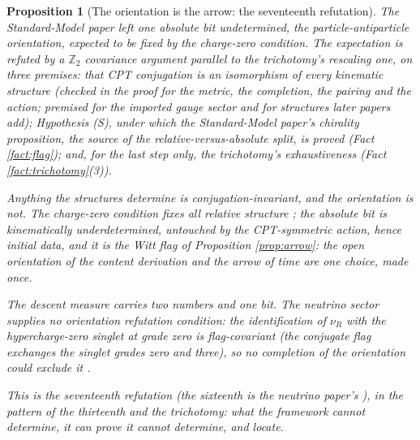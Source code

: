\documentclass[11pt]{article}
\newtheorem{proposition}[theorem]{Proposition}
\theoremstyle{definition}
\begin{document}
\begin{proposition}[The orientation is the arrow: the seventeenth refutation]\label{prop:orientation}
The Standard-Model paper left one absolute bit undetermined, the particle-antiparticle orientation, expected to be fixed by the charge-zero condition. The expectation is refuted by a $\mathbb{Z}_{2}$ covariance argument parallel to the trichotomy's rescaling one, on three premises: that CPT conjugation is an isomorphism of every kinematic structure (checked in the proof for the metric, the completion, the pairing and the action; premised for the imported gauge sector and for structures later papers add); Hypothesis (S), under which the Standard-Model paper's chirality proposition, the source of the relative-versus-absolute split, is proved (Fact \ref{fact:flag}); and, for the last step only, the trichotomy's exhaustiveness (Fact \ref{fact:trichotomy}(3)).

Anything the structures determine is conjugation-invariant, and the orientation is not. The charge-zero condition fixes all \emph{relative} structure \cite[Prop.~5.6]{ButlerT12}; the absolute bit is kinematically underdetermined, untouched by the CPT-symmetric action, hence initial data, and it is the Witt flag of Proposition \ref{prop:arrow}: the open orientation of the content derivation and the arrow of time are one choice, made once.

The descent measure carries two numbers and one bit. The neutrino sector supplies no orientation refutation condition: the identification of $\nu_{R}$ with the hypercharge-zero singlet at grade zero is flag-covariant (the conjugate flag exchanges the singlet grades zero and three), so no completion of the orientation could exclude it \cite{ButlerT15}.

This is the seventeenth refutation (the sixteenth is the neutrino paper's \cite[Prop.~4.1(1)]{ButlerT15}), in the pattern of the thirteenth and the trichotomy: what the framework cannot determine, it can prove it cannot determine, and locate.
\end{proposition}
\end{document}
